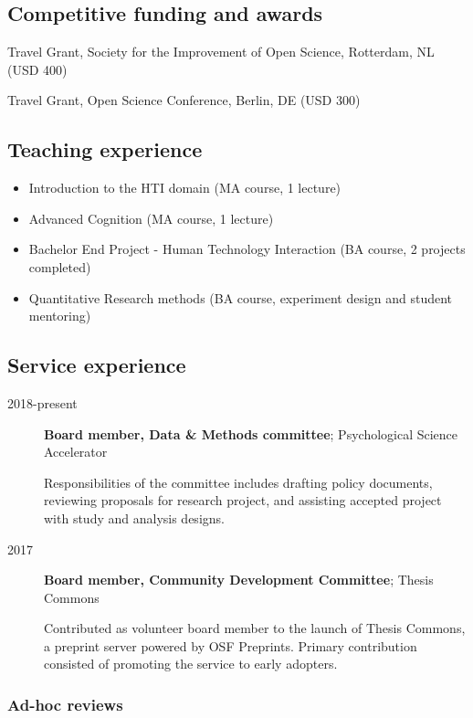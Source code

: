 \documentclass[]{article}
\providecommand{\tightlist}{%
  \setlength{\itemsep}{0pt}\setlength{\parskip}{0pt}}
\begin{document}
\subsection{Competitive funding and
awards}\label{competitive-funding-and-awards}

Travel Grant, Society for the Improvement of Open Science, Rotterdam, NL
(USD 400)

Travel Grant, Open Science Conference, Berlin, DE (USD 300)

\subsection{Teaching experience}\label{teaching-experience}

\begin{itemize}
\tightlist
\item
  Introduction to the HTI domain (MA course, 1 lecture)
\item
  Advanced Cognition (MA course, 1 lecture)
\item
  Bachelor End Project - Human Technology Interaction (BA course, 2
  projects completed)
\item
  Quantitative Research methods (BA course, experiment design and
  student mentoring)
\end{itemize}

\subsection{Service experience}\label{service-experience}

\begin{description}
\item[2018-present]
\textbf{Board member, Data \& Methods committee}; Psychological Science
Accelerator

Responsibilities of the committee includes drafting policy documents,
reviewing proposals for research project, and assisting accepted project
with study and analysis designs.
\item[2017]
\textbf{Board member, Community Development Committee}; Thesis Commons

Contributed as volunteer board member to the launch of Thesis Commons, a
preprint server powered by OSF Preprints. Primary contribution consisted
of promoting the service to early adopters.
\end{description}

\subsubsection{Ad-hoc reviews}\label{ad-hoc-reviews}
\end{document}
